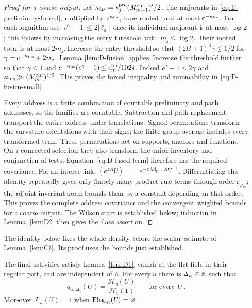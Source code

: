 \begin{proof}[Proof for a coarse output]
Let $\kappa_{\rm fus}=\kappa_j^{\rm pre}(M^{\mathrm{cut}}_{m+1})^2/2$. The majorants in~\eqref{eq:D-preliminary-forced}, multiplied by $e^{\kappa_{\rm fus}}$, have rooted total at most $e^{-\kappa_{\rm fus}}$. For each logarithm use $|e^{\ell_a}-1|\le2|\ell_a|$ once its individual majorant is at most $\log2$; this follows by increasing the entry threshold until $m_j\le\log2$. Their rooted total is at most $2m_j$. Increase the entry threshold so that $(2B+1)^4\gamma\le1/2$ for $\gamma=e^{-\kappa_{\rm fus}}+2m_j$. Lemma~\ref{lem:D-fusion} applies. Increase the threshold further so that $\gamma\le1$ and $e^{-\kappa_{\rm fus}}(e^\gamma-1)\le\epsilon_m^{\rm for}/1024$. Indeed $e^\gamma-1\le2\gamma$ and $\kappa_{\rm fus}\gg(M^{\mathrm{cut}}_m)^{1/5}$. This proves the forced inequality and summability in~\eqref{eq:D-fusion-small}.

Every address is a finite combination of countable preliminary and path addresses, so the families are countable. Subtraction and path replacement transport the entire address under translations. Signed permutations transform the curvature orientations with their signs; the finite group average includes every transformed term. These permutations act on supports, anchors and functions. On a connected selection they also transform the union inventory and conjunction of tests. Equation~\eqref{eq:D-fused-term} therefore has the required covariance. For an inverse link, $(e^{zA}U)^{-1}=e^{-z\operatorname{Ad}_{U^{-1}}A}U^{-1}$. Differentiating this identity repeatedly gives only finitely many product-rule terms through order $\mathfrak q_{J_m}$; the adjoint-invariant norm bounds them by a constant depending on that order. This proves the complete address covariance and the convergent weighted bounds for a coarse output. The Wilson start is established below; induction in Lemma~\ref{lem:D2} then gives the class assertion.
\end{proof}

The identity below fixes the whole density before the scalar estimate of Lemma~\ref{lem:C8}. Its proof uses the bounds just established.
\begin{lemma}\label{lem:D5}
The final activities satisfy Lemma~\ref{lem:D1}, vanish at the flat field in their regular part, and are independent of $\vartheta$. For every $u$ there is $\Delta_u\in\mathbb{R}$ such that
\begin{equation*}
q_{u,\Delta_u}(U)=\frac{\mathcal H_u(U)}{\mathcal H_u(1)}
\qquad\text{for every }U\,.
\end{equation*}
Moreover $\mathcal F_u(U)=1$ when $\operatorname{Flag}_m(U)=\varnothing$. 
\end{lemma}

